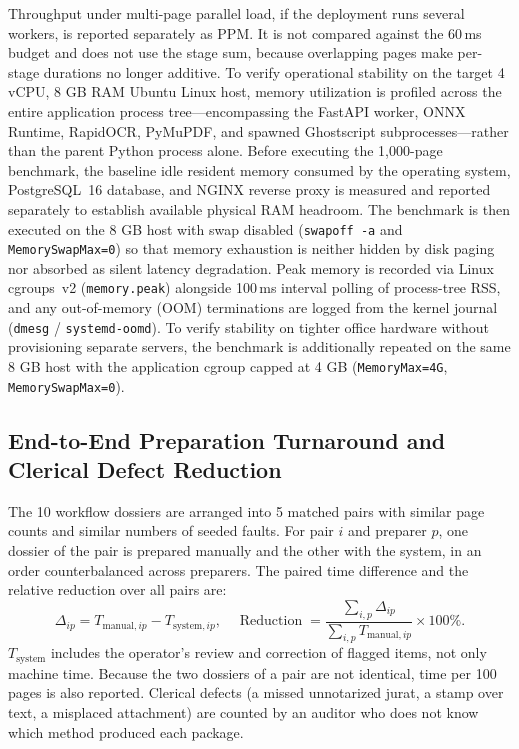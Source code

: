 Throughput under multi-page parallel load, if the deployment runs several workers, is reported separately as PPM. It is not compared against the 60\,ms budget and does not use the stage sum, because overlapping pages make per-stage durations no longer additive. To verify operational stability on the target 4 vCPU, 8 GB RAM Ubuntu Linux host, memory utilization is profiled across the entire application process tree---encompassing the FastAPI worker, ONNX Runtime, RapidOCR, PyMuPDF, and spawned Ghostscript subprocesses---rather than the parent Python process alone. Before executing the 1,000-page benchmark, the baseline idle resident memory consumed by the operating system, PostgreSQL~16 database, and NGINX reverse proxy is measured and reported separately to establish available physical RAM headroom. The benchmark is then executed on the 8 GB host with swap disabled (\texttt{swapoff -a} and \texttt{MemorySwapMax=0}) so that memory exhaustion is neither hidden by disk paging nor absorbed as silent latency degradation. Peak memory is recorded via Linux cgroups~v2 (\texttt{memory.peak}) alongside 100\,ms interval polling of process-tree RSS, and any out-of-memory (OOM) terminations are logged from the kernel journal (\texttt{dmesg} / \texttt{systemd-oomd}). To verify stability on tighter office hardware without provisioning separate servers, the benchmark is additionally repeated on the same 8 GB host with the application cgroup capped at 4 GB (\texttt{MemoryMax=4G}, \texttt{MemorySwapMax=0}).
\subsection{End-to-End Preparation Turnaround and Clerical Defect Reduction}
\label{sec:eval_turnaround}

The 10 workflow dossiers are arranged into 5 matched pairs with similar page counts and similar numbers of seeded faults. For pair $i$ and preparer $p$, one dossier of the pair is prepared manually and the other with the system, in an order counterbalanced across preparers. The paired time difference and the relative reduction over all pairs are:
\begin{equation}
\label{eq:turnaround_reduction}
\Delta_{ip}=T_{\mathrm{manual},ip}-T_{\mathrm{system},ip},\quad
\operatorname{Reduction}=\frac{\sum_{i,p}\Delta_{ip}}{\sum_{i,p}T_{\mathrm{manual},ip}}\times100\%.
\end{equation}
$T_{\mathrm{system}}$ includes the operator's review and correction of flagged items, not only machine time. Because the two dossiers of a pair are not identical, time per 100 pages is also reported. Clerical defects (a missed unnotarized jurat, a stamp over text, a misplaced attachment) are counted by an auditor who does not know which method produced each package.

